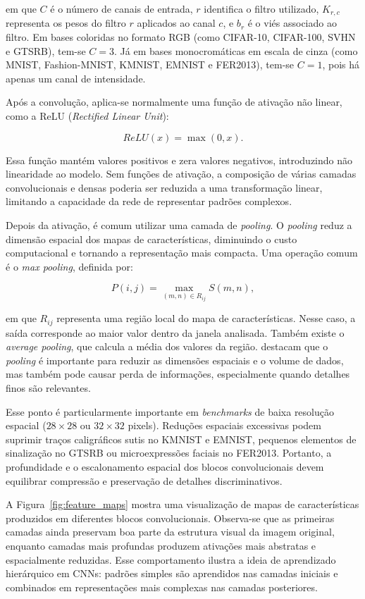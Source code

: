 \documentclass[
    12pt,
    openright,
    oneside,
    a4paper,
    english,
    brazil
]{abntex2}
\begin{document}
em que \(C\) é o número de canais de entrada, \(r\) identifica o filtro utilizado, \(K_{r,c}\) representa os pesos do filtro \(r\) aplicados ao canal \(c\), e \(b_r\) é o viés associado ao filtro. Em bases coloridas no formato RGB (como CIFAR-10, CIFAR-100, SVHN e GTSRB), tem-se \(C=3\). Já em bases monocromáticas em escala de cinza (como MNIST, Fashion-MNIST, KMNIST, EMNIST e FER2013), tem-se \(C=1\), pois há apenas um canal de intensidade.

Após a convolução, aplica-se normalmente uma função de ativação não linear, como a ReLU (\textit{Rectified Linear Unit}):

\[
ReLU(x) = \max(0,x).
\]

Essa função mantém valores positivos e zera valores negativos, introduzindo não linearidade ao modelo. Sem funções de ativação, a composição de várias camadas convolucionais e densas poderia ser reduzida a uma transformação linear, limitando a capacidade da rede de representar padrões complexos.

Depois da ativação, é comum utilizar uma camada de \textit{pooling}. O \textit{pooling} reduz a dimensão espacial dos mapas de características, diminuindo o custo computacional e tornando a representação mais compacta. Uma operação comum é o \textit{max pooling}, definida por:

\[
P(i,j) =
\max_{(m,n)\in R_{ij}}
S(m,n),
\]

em que \(R_{ij}\) representa uma região local do mapa de características. Nesse caso, a saída corresponde ao maior valor dentro da janela analisada. Também existe o \textit{average pooling}, que calcula a média dos valores da região.  destacam que o \textit{pooling} é importante para reduzir as dimensões espaciais e o volume de dados, mas também pode causar perda de informações, especialmente quando detalhes finos são relevantes.

Esse ponto é particularmente importante em \textit{benchmarks} de baixa resolução espacial (\(28 \times 28\) ou \(32 \times 32\) pixels). Reduções espaciais excessivas podem suprimir traços caligráficos sutis no KMNIST e EMNIST, pequenos elementos de sinalização no GTSRB ou microexpressões faciais no FER2013. Portanto, a profundidade e o escalonamento espacial dos blocos convolucionais devem equilibrar compressão e preservação de detalhes discriminativos.

A Figura~\ref{fig:feature_maps} mostra uma visualização de mapas de características produzidos em diferentes blocos convolucionais. Observa-se que as primeiras camadas ainda preservam boa parte da estrutura visual da imagem original, enquanto camadas mais profundas produzem ativações mais abstratas e espacialmente reduzidas. Esse comportamento ilustra a ideia de aprendizado hierárquico em CNNs: padrões simples são aprendidos nas camadas iniciais e combinados em representações mais complexas nas camadas posteriores.
\end{document}
